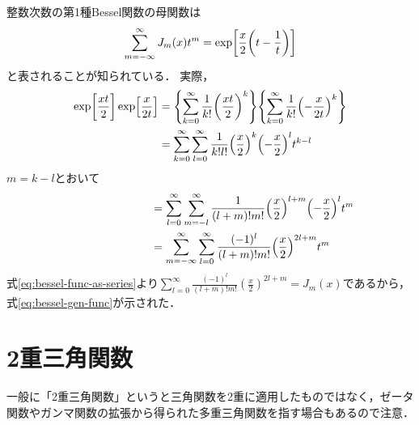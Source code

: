 \documentclass[dvipdfmx,autodetect-engine,12pt,fleqn]{jsarticle}
\begin{document}
整数次数の第1種Bessel関数の母関数は
\begin{equation}
\label{eq:bessel-gen-func}
    \sum_{m=-\infty}^\infty J_m(x)t^m = \exp\sbra*{\frac{x}{2}\qty(t-\frac{1}{t})}
\end{equation}
と表されることが知られている．
実際，
\begin{equation}
\begin{split}
    \exp\sbra*{\frac{x t}{2}}\exp\sbra*{\frac{x}{2t}}
    &=\qty{\sum_{k=0}^\infty \frac{1}{k!}\qty(\frac{x t}{2})^k} \qty{\sum_{k=0}^\infty \frac{1}{k!}\qty(-\frac{x}{2t})^k}\\
    &=\sum_{k=0}^\infty \sum_{l=0}^\infty \frac{1}{k! l!}\qty(\frac{x}{2})^k \qty(-\frac{x}{2})^l t^{k-l}
\end{split} 
\end{equation}
$m=k-l$とおいて
\begin{equation}
\begin{split}
    \phantom{\exp\sbra*{\frac{x t}{2}}\exp\sbra*{\frac{x}{2t}}}
    &=\sum_{l=0}^\infty \sum_{m=-l}^\infty \frac{1}{(l+m)! m!}\qty(\frac{x}{2})^{l+m} \qty(-\frac{x}{2})^l t^m\\
    &=\sum_{m=-\infty}^\infty \sum_{l=0}^\infty \frac{(-1)^l}{(l+m)! m!}\qty(\frac{x}{2})^{2l+m} t^m
\end{split} 
\end{equation}
式\eqref{eq:bessel-func-as-series}より$\sum_{l=0}^\infty \frac{(-1)^l}{(l+m)! m!}(\frac{x}{2})^{2l+m} = J_m(x)$であるから，式\eqref{eq:bessel-gen-func}が示された．

\section{2重三角関数}
\textreferencemark 一般に「2重三角関数」というと三角関数を2重に適用したものではなく，ゼータ関数やガンマ関数の拡張から得られた多重三角関数を指す場合もあるので注意．
\end{document}
